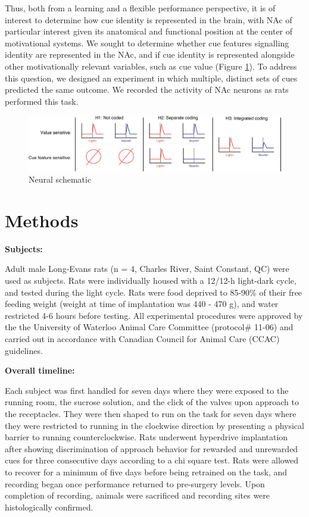 \documentclass[11pt]{article}
\begin{document}
Thus, both from a learning and a flexible performance perspective, it is of interest to determine how cue identity is represented in the brain, with NAc of particular interest given its anatomical and functional position at the center of motivational systems. We sought to determine whether cue features signalling identity are represented in the NAc, and if cue identity is represented alongside other motivationally relevant variables, such as cue value (Figure \ref{fig:schematic}). To address this question, we designed an experiment in which multiple, distinct sets of cues predicted the same outcome. We recorded the activity of NAc neurons as rats performed this task. 

\begin{figure}[h]
\centering
\includegraphics[width=\textwidth]{Fig 1 - Schematic neural.png}
\caption{Neural schematic}
\label{fig:schematic}
\end{figure}

\section*{Methods}

{\bf Subjects:}

Adult male Long-Evans rats (n = 4, Charles River, Saint Constant, QC) were used as subjects. Rats were individually housed with a 12/12-h light-dark cycle, and tested during the light cycle. Rats were food deprived to 85-90\% of their free feeding weight (weight at time of implantation was 440 - 470 g), and water restricted 4-6 hours before testing. All experimental procedures were approved by the the University of Waterloo Animal Care Committee (protocol\# 11-06) and carried out in accordance with Canadian Council for Animal Care (CCAC) guidelines. 

{\bf Overall timeline:}

Each subject was first handled for seven days where they were exposed to the running room, the sucrose solution, and the click of the valves upon approach to the receptacles. They were then shaped to run on the task for seven days where they were restricted to running in the clockwise direction by presenting a physical barrier to running counterclockwise. Rats underwent hyperdrive implantation after showing discrimination of approach behavior for rewarded and unrewarded cues for three consecutive days according to a chi square test. Rats were allowed to recover for a minimum of five days before being retrained on the task, and recording began once performance returned to pre-surgery levels. Upon completion of recording, animals were sacrificed and recording sites were histologically confirmed.
\end{document}
